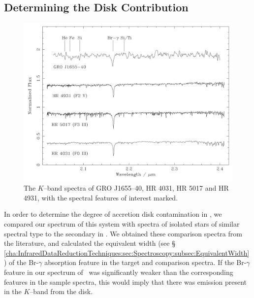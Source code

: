 \subsection{Determining the Disk Contribution}\label{cha:AccretionDiskContamination:sec:Spectroscopy:subsec:DiskContribution}

\begin{figure}[!htb]
\begin{center}
\includegraphics[width=5.0in]{combinedSpectra}
\caption{%
The $K$--band spectra of GRO J1655--40, HR 4031, HR 5017 and HR 4931, with the
spectral features of interest marked.}\label{cha:AccretionDiskContamination:sec:Spectroscopy:subsec:DiskContribution:fig:combinedSpectra}
\end{center}
\end{figure}


In order to determine the degree of accretion disk contamination in
\groj, we compared our spectrum of this system with spectra of
isolated stars of similar spectral type to the secondary in \groj. We
obtained these comparison spectra from the literature, and calculated
the equivalent width (see
\S~%
\vref{cha:InfraredDataReductionTechniques:sec:Spectroscopy:subsec:EquivalentWidth}%
) of the Br-$\gamma$ absorption feature in the target and comparison
spectra. If the Br-$\gamma$ feature in our spectrum of \groj\ was
significantly weaker than the corresponding features in the sample
spectra, this would imply that there was emission present in the $K$--band from the
disk. %

